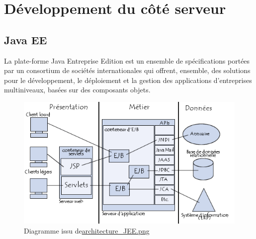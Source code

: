 \section{Développement du côté serveur}

\subsection{Java EE}

La plate-forme Java Entreprise Edition est un ensemble de spécifications portées par un consortium de sociétés internationales qui offrent, ensemble, des solutions pour le développement, le déploiement et la gestion des applications d'entreprises multiniveaux, basées sur des composants objets.

\begin{figure}[!h]
    \center
   	\includegraphics[scale=0.65]{architecture_JEE.png}
   	\caption{Diagramme issu de\url{architecture_JEE.png}}
    \label{reference1}
\end{figure}
\bigskip


